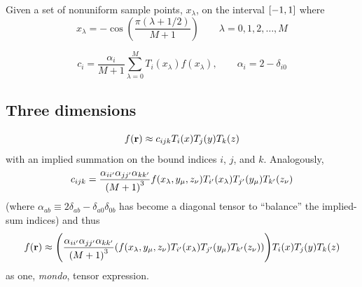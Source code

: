 Given a set of nonuniform sample points, $x_\lambda$, on the interval $\qty[-1, 1]$ where
\begin{equation}
  x_\lambda = -\cos(\frac{\pi (\lambda + 1/2)}{M + 1}) \qquad \lambda = 0, 1, 2, \ldots, M
\end{equation}

\begin{equation}
  c_i = \frac{\alpha_{i}}{M + 1}\sum_{\lambda = 0}^M T_{i}(x_\lambda) f(x_\lambda), \qquad \alpha_i = 2 - \delta_{i0}
\end{equation}

\subsection{Three dimensions}
\begin{equation}
  f(\vb{r}) \approx c_{ijk}T_i(x) T_j(y) T_k(z)
\end{equation}
with an implied summation on the bound indices $i$, $j$, and $k$.
Analogously,
\begin{equation}
  c_{ijk} = \frac{\alpha_{ii'} \alpha_{jj'} \alpha_{kk'}}{\qty(M+1)^3} f(x_\lambda, y_\mu, z_\nu) T_{i'}(x_\lambda) T_{j'}(y_\mu) T_{k'}(z_\nu)
\end{equation}
(where $\alpha_{ab} \equiv 2\delta_{ab} - \delta_{a0}\delta_{0b}$ has become a diagonal tensor to ``balance'' the implied-sum indices) and thus
\begin{equation}
  f(\vb{r}) \approx \qty(\frac{\alpha_{ii'} \alpha_{jj'} \alpha_{kk'}}{\qty(M+1)^3} \qty(f(x_\lambda, y_\mu, z_\nu) T_{i'}(x_\lambda) T_{j'}(y_\mu) T_{k'}(z_\nu))) T_i(x) T_j(y) T_k(z)
\end{equation}
as one, \emph{mondo}, tensor expression.

